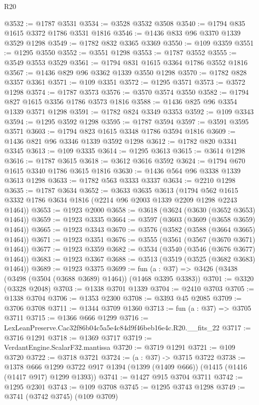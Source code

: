\begin{lexlean}{R20}
\begin{coremodule}
@3532 := @1787 @3531
@3534 := @3528 @3532 @3508
@3540 := @1794 @835 @1615 @3372 @1786 @3531 @1816
@3546 := @1436 @833 @96 @3370 @1339 @3529 @1298
@3549 := @1782 @832 @3365 @3369
@3550 := @109 @3359
@3551 := @1295 @3550
@3552 := @3551 @1298
@3553 := @1787 @3552
@3555 := @3549 @3553 @3529
@3561 := @1794 @831 @1615 @3364 @1786 @3552 @1816
@3567 := @1436 @829 @96 @3362 @1339 @3550 @1298
@3570 := @1782 @828 @3357 @3361
@3571 := @109 @3351
@3572 := @1295 @3571
@3573 := @3572 @1298
@3574 := @1787 @3573
@3576 := @3570 @3574 @3550
@3582 := @1794 @827 @1615 @3356 @1786 @3573 @1816
@3588 := @1436 @825 @96 @3354 @1339 @3571 @1298
@3591 := @1782 @824 @3349 @3353
@3592 := @109 @3343
@3594 := @1295 @3592 @1298
@3595 := @1787 @3594
@3597 := @3591 @3595 @3571
@3603 := @1794 @823 @1615 @3348 @1786 @3594 @1816
@3609 := @1436 @821 @96 @3346 @1339 @3592 @1298
@3612 := @1782 @820 @3341 @3345
@3613 := @109 @3335
@3614 := @1295 @3613
@3615 := @3614 @1298
@3616 := @1787 @3615
@3618 := @3612 @3616 @3592
@3624 := @1794 @670 @1615 @3340 @1786 @3615 @1816
@3630 := @1436 @564 @96 @3338 @1339 @3613 @1298
@3633 := @1782 @563 @3333 @3337
@3634 := @2210 @1298
@3635 := @1787 @3634
@3652 := @3633
    @3635
    @3613
    (@1794 @562 @1615 @3332 @1786 @3634 @1816 (@2214 @96 @2003 @1339 @2209 @1298 @2243 @1464))
@3653 := @1923 @2000
@3658 := @3618 (@3624 (@3630 (@3652 @3653) @1464))
@3659 := @1923 @3335
@3664 := @3597 (@3603 (@3609 (@3658 @3659) @1464))
@3665 := @1923 @3343
@3670 := @3576 (@3582 (@3588 (@3664 @3665) @1464))
@3671 := @1923 @3351
@3676 := @3555 (@3561 (@3567 (@3670 @3671) @1464))
@3677 := @1923 @3359
@3682 := @3534 (@3540 (@3546 (@3676 @3677) @1464))
@3683 := @1923 @3367
@3688 := @3513 (@3519 (@3525 (@3682 @3683) @1464))
@3689 := @1923 @3375
@3699 := fun (a : @37) => @3426 (@3438 (@3498 (@3504 (@3688 @3689) @1464)) (@1468 @3395 @3383))
@3701 := @3320 (@3328 @2048)
@3703 := @1338 @3701 @1339
@3704 := @2410 @3703
@3705 := @1338 @3704
@3706 := @1353 @2300
@3708 := @3393 @45 @2085
@3709 := @3706 @3708
@3711 := @1344 @3709 @1360
@3713 := fun (a : @37) => @3705 @3711
@3715 := @1366 @666 @1299
@3716 := LexLeanPreserve.Cac32f86b04c5a5e4c84d9f46beb16e4c.R20.__fits_22
@3717 := @3716 @1291
@3718 := @1369 @3717
@3719 := VerdantEngine.ScalarF32.mantissa
@3720 := @3719 @1291
@3721 := @109 @3720
@3722 := @3718 @3721
@3724 := (a : @37) -> @3715 @3722
@3738 := @1378
    @666
    @1299
    @3722
    @917
    @1394
    (@1399 (@1409 @666))
    (@1415 (@1416 (@1417 @917) @1299 @1393))
@3741 := @1427 @915 @3704 @3711
@3742 := @1295 @2301
@3743 := @109 @3708
@3745 := @1295 @3743 @1298
@3749 := @3741 (@3742 @3745) (@109 @3709)

\end{coremodule}
\end{lexlean}

